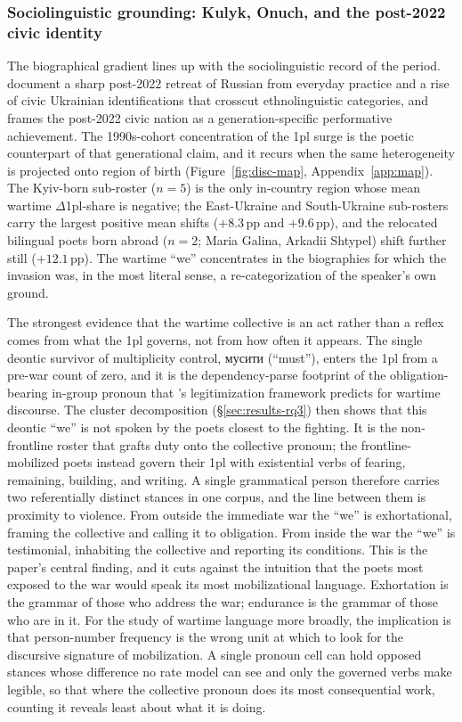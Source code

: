 \documentclass[12pt]{interact}
\theoremstyle{plain}%
\theoremstyle{definition}
\theoremstyle{remark}
\begin{document}
\subsubsection{Sociolinguistic grounding: Kulyk, Onuch, and the post-2022 civic identity}

The biographical gradient lines up with the sociolinguistic record of the period. \citet{kulyk2022imperfect, kulyk2024language} document a sharp post-2022 retreat of Russian from everyday practice and a rise of civic Ukrainian identifications that crosscut ethnolinguistic categories, and \citet{onuch2022the} frames the post-2022 civic nation as a generation-specific performative achievement. The 1990s-cohort concentration of the 1pl surge is the poetic counterpart of that generational claim, and it recurs when the same heterogeneity is projected onto region of birth (Figure~\ref{fig:disc-map}, Appendix~\ref{app:map}). The Kyiv-born sub-roster ($n = 5$) is the only in-country region whose mean wartime $\Delta$1pl-share is negative; the East-Ukraine and South-Ukraine sub-rosters carry the largest positive mean shifts ($+8.3\,$pp and $+9.6\,$pp), and the relocated bilingual poets born abroad ($n = 2$; Maria Galina, Arkadii Shtypel) shift further still ($+12.1\,$pp). The wartime ``we'' concentrates in the biographies for which the invasion was, in the most literal sense, a re-categorization of the speaker's own ground.

The strongest evidence that the wartime collective is an act rather than a reflex comes from what the 1pl governs, not from how often it appears. The single deontic survivor of multiplicity control, \textukrainian{мусити} (``must''), enters the 1pl from a pre-war count of zero, and it is the dependency-parse footprint of the obligation-bearing in-group pronoun that \citet{reyes2011strategies}'s legitimization framework predicts for wartime discourse. The cluster decomposition (\S\ref{sec:results-rq3}) then shows that this deontic ``we'' is not spoken by the poets closest to the fighting. It is the non-frontline roster that grafts duty onto the collective pronoun; the frontline-mobilized poets instead govern their 1pl with existential verbs of fearing, remaining, building, and writing. A single grammatical person therefore carries two referentially distinct stances in one corpus, and the line between them is proximity to violence. From outside the immediate war the ``we'' is exhortational, framing the collective and calling it to obligation. From inside the war the ``we'' is testimonial, inhabiting the collective and reporting its conditions. This is the paper's central finding, and it cuts against the intuition that the poets most exposed to the war would speak its most mobilizational language. Exhortation is the grammar of those who address the war; endurance is the grammar of those who are in it. For the study of wartime language more broadly, the implication is that person-number frequency is the wrong unit at which to look for the discursive signature of mobilization. A single pronoun cell can hold opposed stances whose difference no rate model can see and only the governed verbs make legible, so that where the collective pronoun does its most consequential work, counting it reveals least about what it is doing.
\end{document}
